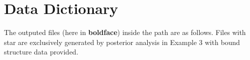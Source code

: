 \documentclass[11pt]{article}
\begin{document}
\section{Data Dictionary}


The outputed files (here in \textbf{boldface}) inside the path  are as follows. Files with star are exclusively generated by posterior analysis in Example 3 with bound structure data provided.
\end{document}

